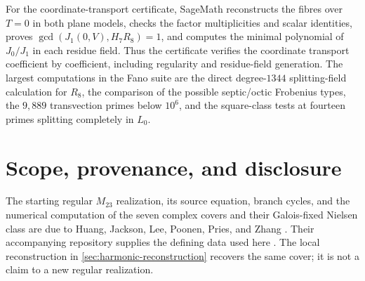 \documentclass[11pt]{amsart}
\theoremstyle{definition}
\theoremstyle{remark}
\begin{document}
For the coordinate-transport certificate, SageMath reconstructs the fibres
over $T=0$ in both plane models,
checks the factor multiplicities and scalar identities, proves
$\gcd(J_1(0,V),H_7R_8)=1$, and computes the minimal polynomial of $J_0/J_1$
in each residue field.  Thus the certificate verifies the coordinate
transport coefficient by coefficient, including regularity and residue-field
generation.
The largest computations in the Fano suite are the direct degree-$1344$
splitting-field calculation for $R_8$, the comparison of the possible
septic/octic Frobenius types, the $9{,}889$ transvection primes below
$10^6$, and the square-class tests at fourteen primes splitting completely
in $L_0$.

\section{Scope, provenance, and disclosure}
\label{sec:scope}

The starting regular $M_{23}$ realization, its source equation, branch cycles, and the
numerical computation of the seven complex covers and their Galois-fixed
Nielsen class are due to Huang, Jackson, Lee, Poonen, Pries, and Zhang
\cite{HJLPPZ}.  Their accompanying repository supplies the defining data
used here \cite{M23data}.  The local reconstruction in
\cref{sec:harmonic-reconstruction} recovers the same cover; it is
not a claim to a new regular realization.
\end{document}
